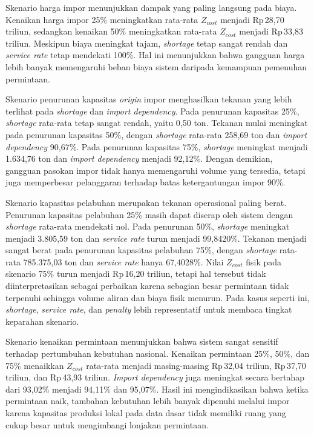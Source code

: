 \documentclass{file/TA-ITS}
\theoremstyle{definition}
\theoremstyle{definition}
\theoremstyle{plain}
\begin{document}

Skenario harga impor menunjukkan dampak yang paling langsung pada biaya. Kenaikan harga impor 25\% meningkatkan rata-rata $Z_{cost}$ menjadi Rp\,28{,}70 triliun, sedangkan kenaikan 50\% meningkatkan rata-rata $Z_{cost}$ menjadi Rp\,33{,}83 triliun. Meskipun biaya meningkat tajam, \textit{shortage} tetap sangat rendah dan \textit{service rate} tetap mendekati 100\%. Hal ini menunjukkan bahwa gangguan harga lebih banyak memengaruhi beban biaya sistem daripada kemampuan pemenuhan permintaan.

Skenario penurunan kapasitas \textit{origin} impor menghasilkan tekanan yang lebih terlihat pada \textit{shortage} dan \textit{import dependency}. Pada penurunan kapasitas 25\%, \textit{shortage} rata-rata tetap sangat rendah, yaitu 0{,}50 ton. Tekanan mulai meningkat pada penurunan kapasitas 50\%, dengan \textit{shortage} rata-rata 258{,}69 ton dan \textit{import dependency} 90{,}67\%. Pada penurunan kapasitas 75\%, \textit{shortage} meningkat menjadi 1.634{,}76 ton dan \textit{import dependency} menjadi 92{,}12\%. Dengan demikian, gangguan pasokan impor tidak hanya memengaruhi volume yang tersedia, tetapi juga memperbesar pelanggaran terhadap batas ketergantungan impor 90\%.

Skenario kapasitas pelabuhan merupakan tekanan operasional paling berat. Penurunan kapasitas pelabuhan 25\% masih dapat diserap oleh sistem dengan \textit{shortage} rata-rata mendekati nol. Pada penurunan 50\%, \textit{shortage} meningkat menjadi 3.805{,}59 ton dan \textit{service rate} turun menjadi 99{,}8420\%. Tekanan menjadi sangat berat pada penurunan kapasitas pelabuhan 75\%, dengan \textit{shortage} rata-rata 785.375{,}03 ton dan \textit{service rate} hanya 67{,}4028\%. Nilai $Z_{cost}$ fisik pada skenario 75\% turun menjadi Rp\,16{,}20 triliun, tetapi hal tersebut tidak diinterpretasikan sebagai perbaikan karena sebagian besar permintaan tidak terpenuhi sehingga volume aliran dan biaya fisik menurun. Pada kasus seperti ini, \textit{shortage}, \textit{service rate}, dan \textit{penalty} lebih representatif untuk membaca tingkat keparahan skenario.

Skenario kenaikan permintaan menunjukkan bahwa sistem sangat sensitif terhadap pertumbuhan kebutuhan nasional. Kenaikan permintaan 25\%, 50\%, dan 75\% menaikkan $Z_{cost}$ rata-rata menjadi masing-masing Rp\,32{,}04 triliun, Rp\,37{,}70 triliun, dan Rp\,43{,}93 triliun. \textit{Import dependency} juga meningkat secara bertahap dari 93{,}02\% menjadi 94{,}11\% dan 95{,}07\%. Hasil ini mengindikasikan bahwa ketika permintaan naik, tambahan kebutuhan lebih banyak dipenuhi melalui impor karena kapasitas produksi lokal pada data dasar tidak memiliki ruang yang cukup besar untuk mengimbangi lonjakan permintaan.
\end{document}
